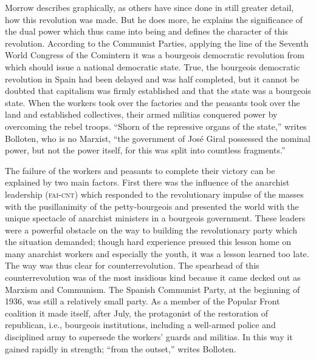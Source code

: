 Morrow describes graphically, as others have since done in still greater detail, how this revolution was made. But he does more, he explains the significance of the dual power which thus came into being and defines the character of this revolution. According to the Communist Parties, applying the line of the Seventh World Congress of the Comintern\label{en:BollotenGrandCamouflageP42} it was a bourgeois democratic revolution from which should issue a national democratic state. True, the bourgeois democratic revolution in Spain had been delayed and was half completed, but it cannot be doubted that capitalism was firmly established and that the state was a bourgeois state. When the workers took over the factories and the peasants took over the land and established collectives, their armed militias conquered power by overcoming the rebel troops. ``Shorn of the repressive organs of the state,'' writes Bolloten{\indexBBolloten}, who is no Marxist, ``the government of Jos\'e Giral{\indexJGiral} possessed the nominal power, but not the power itself, for this was split into countless fragments.''\endnotemark[\ref{en:BollotenGrandCamouflageP42}]

The failure of the workers and peasants to complete their victory can be explained by two main factors. First there was the influence of the anarchist leadership (\textsc{fai-cnt}) which responded to the revolutionary impulse of the masses with the pusillanimity of the petty-bourgeois and presented the world with the unique spectacle of anarchist ministers in a bourgeois government. These leaders were a powerful obstacle on the way to building the revolutionary party which the situation demanded; though hard experience pressed this lesson home on many anarchist workers and especially the youth, it was a lesson learned too late. The way was thus clear for counterrevolution. The spearhead of this counterrevolution was of the most insidious kind because it came decked out as Marxism and Communism. The Spanish Communist Party\indexPCE, at the beginning of 1936, was still a relatively small party. As a member of the Popular Front coalition it made itself, after July, the protagonist of the restoration of republican, i.e., bourgeois institutions, including a well-armed police and disciplined army to supersede the workers’ guards and militias. In this way it gained rapidly in strength; ``from the outset,'' writes Bolloten.

